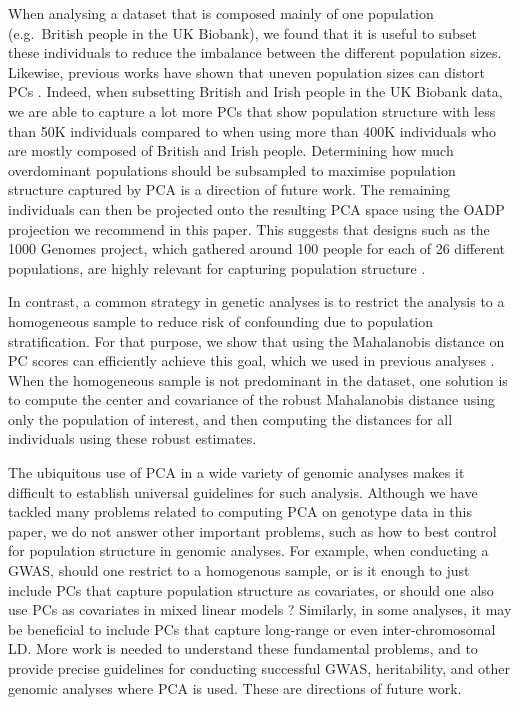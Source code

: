 \documentclass{bioinfo}
\begin{document}
When analysing a dataset that is composed mainly of one population (e.g.\ British people in the UK Biobank), we found that it is useful to subset these individuals to reduce the imbalance between the different population sizes.
Likewise, previous works have shown that uneven population sizes can distort PCs \cite[]{novembre2008interpreting,mcvean2009genealogical}. 
Indeed, when subsetting British and Irish people in the UK Biobank data, we are able to capture a lot more PCs that show population structure with less than 50K individuals compared to when using more than 400K individuals who are mostly composed of British and Irish people.
Determining how much overdominant populations should be subsampled to maximise population structure captured by PCA is a direction of future work.
The remaining individuals can then be projected onto the resulting PCA space using the OADP projection we recommend in this paper.
This suggests that designs such as the 1000 Genomes project, which gathered around 100 people for each of 26 different populations, are highly relevant for capturing population structure \cite[]{10002015global}.

In contrast, a common strategy in genetic analyses is to restrict the analysis to a homogeneous sample to reduce risk of confounding due to population stratification.
For that purpose, we show that using the Mahalanobis distance on PC scores can efficiently achieve this goal, which we used in previous analyses \cite[]{prive2019efficient}.
When the homogeneous sample is not predominant in the dataset, one solution is to compute the center and covariance of the robust Mahalanobis distance using only the population of interest, and then computing the distances for all individuals using these robust estimates. 

The ubiquitous use of PCA in a wide variety of genomic analyses makes it difficult to establish universal guidelines for such analysis. 
Although we have tackled many problems related to computing PCA on genotype data in this paper, we do not answer other important problems, such as how to best control for population structure in genomic analyses. 
For example, when conducting a GWAS, should one restrict to a homogenous sample, or is it enough to just include PCs that capture population structure as covariates, or should one also use PCs as covariates in mixed linear models \cite[]{price2010new,loh2015efficient}?
Similarly, in some analyses, it may be beneficial to include PCs that capture long-range or even inter-chromosomal LD. More work is needed to understand these fundamental problems, and to provide precise guidelines for conducting successful GWAS, heritability, and other genomic analyses where PCA is used. These are directions of future work.
\end{document}
